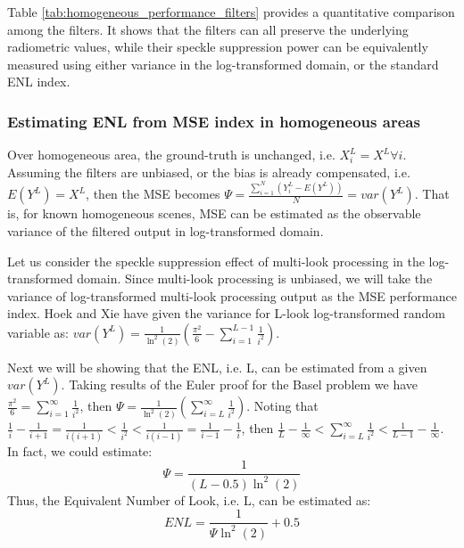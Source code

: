 Table \ref{tab:homogeneous_performance_filters} provides a quantitative comparison among the filters.
It shows that the filters can all preserve the underlying radiometric values, while their speckle suppression power can be equivalently measured using either variance in the log-transformed domain, or the standard ENL index.

\subsubsection{ Estimating ENL from MSE index in homogeneous areas }

Over homogeneous area, the ground-truth is unchanged, i.e. $X^L_i=X^L \forall i$.
Assuming the filters are unbiased, or the bias is already compensated, i.e. $E(Y^L)=X^L$, then the MSE becomes $\Psi = \frac{ \sum^N_{i=1}{ (Y^L_i - E(Y^L)) } }{N} = var(Y^L)$.
That is, for known homogeneous scenes, MSE can be estimated as the observable variance of the filtered output in log-transformed domain.

Let us consider the speckle suppression effect of multi-look processing in the log-transformed domain. 
Since multi-look processing is unbiased, we will take the variance of log-transformed multi-look processing output as the MSE performance index. 
Hoek \cite{Hoekman_1991_TGRS} and Xie \cite{Xie_2002_TGRS} have given the variance for L-look log-transformed random variable as: $var(Y^L)= \frac{1}{\ln^2(2)} \left( \frac{\pi^2}{6} - \sum^{L-1}_{i=1}{\frac{1}{i^2}} \right)$.

Next we will be showing that the ENL, i.e. L, can be estimated from a given $var(Y^L)$. 
Taking results of the Euler proof for the Basel problem we have $\frac{\pi^2}{6} = \sum^{\infty}_{i=1}{ \frac{1}{i^2} } $, then $\Psi= \frac{1}{\ln^2(2)} \left( \sum^{\infty}_{i=L}{ \frac{1}{i^2} } \right) $.
Noting that $ \frac{1}{i} - \frac{1}{i+1} = \frac{1}{i(i+1)} < \frac{1}{i^2} < \frac{1}{i(i-1)} = \frac{1}{i-1} - \frac{1}{i}$, then $ \frac{1}{L} - \frac{1}{\infty} < \sum^{\infty}_{i=L}{ \frac{1}{i^2} }  < \frac{1}{L-1} - \frac{1}{\infty} $.
In fact, we could estimate:
\begin{equation}
  \Psi = \frac{1}{(L-0.5) \ln^2(2) }
\label{eqn:perf_index_analytic}
\end{equation}
Thus, the Equivalent Number of Look, i.e. L, can be estimated as:
\begin{equation}
ENL = \frac{1}{\Psi \ln^2(2)} + 0.5
\label{eqn:enl_analytic}
\end{equation}

